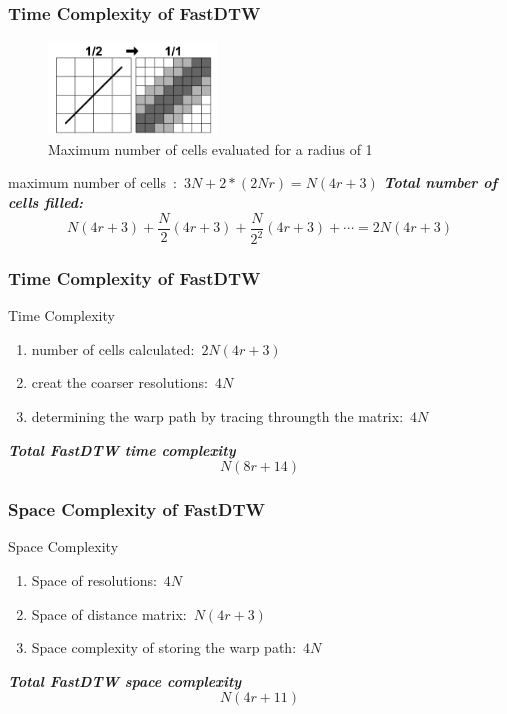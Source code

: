 \documentclass[xetex,mathserif,serif]{beamer}
\begin{document}
\begin{frame}
\frametitle{Time Complexity of FastDTW}
\begin{figure}
  \centering
  \includegraphics[width=0.4\textwidth]{evaluation.png}
  \caption{\tiny Maximum number of cells evaluated for a radius of 1}\label{fig:8}
\end{figure}

maximum number of cells\ :\ $3N+2*(2Nr) = N(4r+3)$
\newline
\textbf{\emph{Total number of cells filled: }}\[N\left( {4r + 3} \right) + \frac{N}{2}\left( {4r + 3} \right) + \frac{N}{{{2^2}}}\left( {4r + 3} \right) +  \cdots  = 2N\left( {4r + 3} \right)\]
\end{frame}

\begin{frame}
\frametitle{Time Complexity of FastDTW}
\begin{block}{Time Complexity}
\begin{enumerate}
  \item number of cells calculated:\ $2N(4r+3)$
  \item creat the coarser resolutions:\ $4N$
  \item determining the warp path by tracing throungth the matrix:\ $4N$
\end{enumerate}
\end{block}

\begin{block}{\textbf{\emph{Total FastDTW time complexity}}}
\[N(8r+14)\]
\end{block}
\end{frame}

\begin{frame}
\frametitle{Space Complexity of FastDTW}
\begin{block}{Space Complexity}
\begin{enumerate}
  \item Space of resolutions:\ $4N$
  \item Space of distance matrix:\ $N(4r+3)$
  \item Space complexity of storing the warp path:\ $4N$
\end{enumerate}
\end{block}

\begin{block}{\textbf{\emph{Total FastDTW space complexity}}}
\[N(4r+11)\]
\end{block}
\end{frame}
\end{document}
